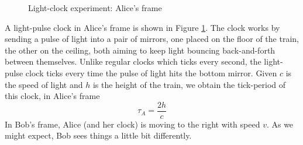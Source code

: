 \documentclass[a4paper,11pt]{article}
\numberwithin{equation}{section}
\begin{document}
 \begin{figure}[htb] 
 	\centering
 	\caption{Light-clock experiment: Alice's frame}
 	\label{fig: alice's frame 2}
 \end{figure}
 \noindent A light-pulse clock in Alice's frame is shown in Figure \ref{fig: alice's frame 2}. The clock works by sending a pulse of light into a pair of mirrors, one placed on the floor of the train, the other on the ceiling, both aiming to keep light bouncing back-and-forth between themselves. Unlike regular clocks which ticks every second, the light-pulse clock ticks every time the pulse of light hits the bottom mirror. Given $c$ is the speed of light and $h$ is the height of the train, we obtain the tick-period of this clock, in Alice's frame
 \begin{equation}\label{eq:4.16}
 \tau_{A}=\frac{2h}{c}
 \end{equation}
 In Bob's frame, Alice (and her clock) is moving to the right with speed $v$. As we might expect, Bob sees things a little bit differently.
\end{document}
